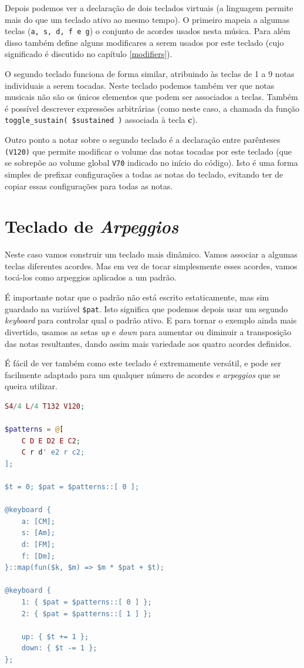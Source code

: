 Depois podemos ver a declaração de dois teclados virtuais (a linguagem permite mais do que um teclado ativo ao mesmo tempo). O primeiro mapeia a algumas teclas (\texttt{a, s, d, f e g}) o conjunto de acordes usados nesta música. Para além disso também define alguns modificares a serem usados por este teclado (cujo significado é discutido no capítulo \ref{modifiers}).

O segundo teclado funciona de forma similar, atribuindo às teclas de 1 a 9 notas individuais a serem tocadas. Neste teclado podemos também ver que notas musicais não são os únicos elementos que podem ser associados a teclas. Também é possível descrever expressões arbitrárias (como neste caso, a chamada da função \texttt{toggle\_sustain( \$sustained )} associada à tecla \textbf{c}).

Outro ponto a notar sobre o segundo teclado é a declaração entre parênteses \texttt{(V120)} que permite modificar o volume das notas tocadas por este teclado (que se sobrepõe ao volume global \texttt{V70} indicado no início do código). Isto é uma forma simples de prefixar configurações a todas as notas do teclado, evitando ter de copiar essas configurações para todas as notas.

\section{Teclado de \textit{Arpeggios}}
Neste caso vamos construir um teclado mais dinâmico. Vamos associar a algumas teclas diferentes acordes. Mas em vez de tocar simplesmente esses acordes, vamos tocá-los como arpeggios aplicados a um padrão.

É importante notar que o padrão não está escrito estaticamente, mas sim guardado na variável \texttt{\$pat}. Isto significa que podemos depois usar um segundo \textit{keyboard} para controlar qual o padrão ativo. E para tornar o exemplo ainda mais divertido, usamos as setas \textit{up} e \textit{down} para aumentar ou diminuir a transposição das notas resultantes, dando assim mais variedade aos quatro acordes definidos.

É fácil de ver também como este teclado é extremamente versátil, e pode ser facilmente adaptado para um qualquer número de acordes e \textit{arpeggios} que se queira utilizar.

\begin{lstlisting}[caption=Definição de um teclado de acordes,language=PHP]
S4/4 L/4 T132 V120;

$patterns = @[
    C D E D2 E C2;
    C r d' e2 r c2;
];

$t = 0; $pat = $patterns::[ 0 ];

@keyboard {
    a: [CM];
    s: [Am];
    d: [FM];
    f: [Dm];
}::map(fun($k, $m) => $m * $pat + $t);

@keyboard {
    1: { $pat = $patterns::[ 0 ] };
    2: { $pat = $patterns::[ 1 ] };

    up: { $t += 1 };
    down: { $t -= 1 };
};
\end{lstlisting}

